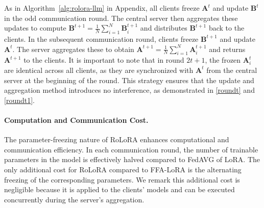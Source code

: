 \documentclass{article}
\theoremstyle{plain}
\theoremstyle{definition}
\theoremstyle{remark}
\begin{document}
\vspace{-0.2cm}
As in Algorithm~\ref{alg:rolora-llm} in Appendix, all clients freeze $\mathbf{A}^t$ and update $\mathbf{B}^{t}$ in the odd communication round. The central server then aggregates these updates to compute $\mathbf{B}^{t+1} = \frac{1}{N}\sum_{i=1}^{N}\mathbf{B}^{t+1}_i$ and distributes $\mathbf{B}^{t+1}$ back to the clients. In the subsequent communication round, clients freeze $\mathbf{B}^{t+1}$ and update $\mathbf{A}^{t}$. The server aggregates these to obtain $\mathbf{A}^{t+1} = \frac{1}{N}\sum_{i=1}^{N}\mathbf{A}^{t+1}_i$ and returns $\mathbf{A}^{t+1}$ to the clients. 
It is important to note that in round $2t+1$, the frozen $\mathbf{A}_i^t$ are identical across all clients, as they are synchronized with $\mathbf{A}^t$ from the central server at the beginning of the round. This strategy ensures that the update and aggregation method introduces no interference, as demonstrated in \eqref{roundt} and \eqref{roundt1}.

\vspace{-0.2cm}
\paragraph{Computation and Communication Cost.}
The parameter-freezing nature of RoLoRA enhances computational and communication efficiency. In each communication round, the number of trainable parameters in the model is effectively halved compared to FedAVG of LoRA. The only additional cost for RoLoRA compared to FFA-LoRA is the alternating freezing of the corresponding parameters. We remark this additional cost is negligible because it is applied to the clients' models and can be executed concurrently during the server's aggregation.
\end{document}
